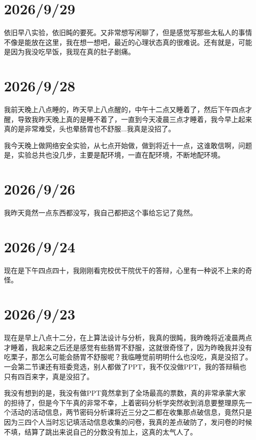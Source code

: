 


\section*{2026/9/29}

依旧早八实验，依旧盹的要死。又非常想写闲聊了，但是感觉写那些太私人的事情不像是能放在这里，我在想一想吧，最近的心理状态真的很难说。还有就是，可能是因为我没吃早饭，我现在真的肚子剧痛。
\section*{2026/9/28}
我前天晚上八点睡的，昨天早上八点醒的，中午十二点又睡着了，然后下午四点才醒，导致我昨天晚上真的是睡不着了，一直到今天凌晨三点才睡着，我今早上起来真的是非常难受，头也晕肠胃也不舒服...我真是没招了。

我今天晚上做网络安全实验，从七点开始做，做到将近十一点，这谁敢信啊，问题是，实验总共也没几步，主要是配环境，一直在配环境，不断地配环境。

\section*{2026/9/26}

我昨天竟然一点东西都没写，我自己都把这个事给忘记了竟然。

\section*{2026/9/24}

现在是下午四点四十，我刚刚看完校优干院优干的答辩，心里有一种说不上来的奇怪。
	
\section*{2026/9/23}

现在是早上八点十二分，在上算法设计与分析，我真的很盹，我昨晚将近凌晨两点才睡着，我起来之后还是感觉有些肠胃不舒服，这就很奇怪了，因为昨晚我并没有吃栗子，那怎么可能会肠胃不舒服呢？我临睡觉前明明什么也没吃，真是没招了。一会第二节课还有班委竞选，别人都做了PPT，我不仅没做PPT，我的答辩稿也只有四百来字，真是没招了。

我没有想到的是，我没有做PPT竟然拿到了全场最高的票数，真的非常承蒙大家的担待了，但是今下午真的非常不幸，上着密码分析学突然收到消息要整理原先一个活动的活动信息，两节密码分析课将近三分之二都在收集那点破信息，竟然只是因为三四个人当时忘记填活动信息收集的问卷，我真的差点破防了，发问卷的时候不填，结算了跳出来说自己的分数没有加上，这真的太气人了。

